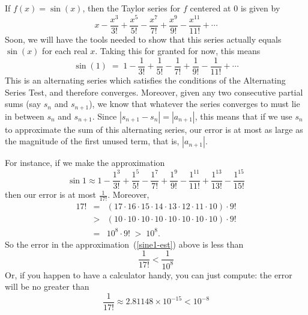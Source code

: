 \documentclass[main]{subfiles}
\begin{document}
\begin{enumerate}
\begin{enumerate}
\begin{solution}
If $f(x) = \sin(x)$, then the Taylor series for $f$ centered at $0$ is given by
$$
  x - \frac{x^3}{3!} + \frac{x^5}{5!}-\frac{x^7}{7!} +\frac{x^9}{9!} - \frac{x^{11}}{11!} + \cdots
$$
Soon, we will have the tools needed to show that this series actually equals $\sin(x)$
for each real $x$.  Taking this for granted for now, this means
$$
  \sin(1) \; = \;  1 - \frac{1}{3!} + \frac{1}{5!} - \frac{1}{7!} + \frac{1}{9!} - \frac{1}{11!} + \cdots
$$
This is an alternating series which satisfies the conditions of the Alternating Series Test,
and therefore converges.  Moreover, given any two consecutive partial sums (say $s_{n}$ and $s_{n+1}$),
we know that whatever the series converges to must lie in between $s_{n}$ and $s_{n+1}$.  
Since $|s_{n+1} - s_{n}| = |a_{n+1}|$, this means that if we use $s_{n}$ to approximate
the sum of this alternating series, our error is at most as large as the magnitude of 
the first unused term, that is, $|a_{n+1}|$.

For instance, if we make the approximation
\begin{equation}
  \label{sine1-est}
  \sin 1 \approx 1 - \frac{1^3}{3!} + \frac{1^5}{5!}-\frac{1^7}{7!} 
   +\frac{1^9}{9!} - \frac{1^{11}}{11!} + \frac{1^{13}}{13!} - \frac{1^{15}}{15!}
\end{equation}
then our error is at most $\displaystyle \frac{1}{17!}$.  Moreover,
\begin{eqnarray*}
17! &=& (17 \cdot 16 \cdot 15 \cdot 14 \cdot 13 \cdot 12 \cdot 11 \cdot 10) \cdot 9!\\
    &>& (10 \cdot 10 \cdot 10 \cdot 10 \cdot 10 \cdot 10 \cdot 10 \cdot 10) \cdot 9!\\
    &=&  10^{8} \cdot 9! \; > \; 10^{8}.
\end{eqnarray*}
So the error in the approximation~(\ref{sine1-est}) above is less than 
\[\frac{1}{17!} < \frac{1}{10^8}\]
Or, if you happen to have a calculator handy, you can just compute: the error will be no 
greater than
\[\frac{1}{17!} \approx 2.81148 \times 10^{-15} < 10^{-8}\]


\end{solution}









\end{enumerate}





\end{enumerate}
\end{document}
